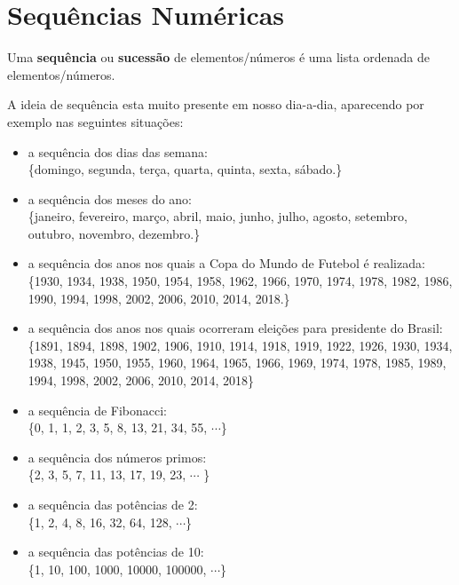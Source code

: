 \chapter{Sequências Numéricas}


\colorbox{azul}{
 \begin{minipage}{14.5cm}
 \begin{center}
  Uma \textbf{sequência} ou \textbf{sucessão} de elementos/números é uma lista ordenada de elementos/números.
 \end{center}
 \end{minipage}}
 \vskip0.3cm


A ideia de sequência esta muito presente em nosso dia-a-dia, aparecendo por exemplo nas seguintes situações:
\begin{exem}
 \begin{itemize}
  Exemplos de sequências:
  \item a sequência dos dias das semana:\\
  \{domingo, segunda, terça, quarta, quinta, sexta, sábado.\}
  \item a sequência dos meses do ano: \\
  \{janeiro, fevereiro, março, abril, maio, junho, julho, agosto, setembro, outubro, novembro, dezembro.\}
  \item a sequência dos anos nos quais a Copa do Mundo de Futebol é realizada: \\
  \{1930, 1934, 1938, 1950, 1954, 1958, 1962, 1966, 1970, 1974, 1978, 1982, 1986, 1990, 1994, 1998, 2002, 2006, 2010, 2014, 2018.\}
  \item a sequência dos anos nos quais ocorreram eleições para presidente do Brasil: \\
  \{1891, 1894, 1898, 1902, 1906, 1910, 1914, 1918, 1919, 1922, 1926, 1930, 1934, 1938, 1945, 1950, 1955, 1960, 1964, 1965, 1966, 1969, 1974, 1978, 1985, 1989, 1994, 1998, 2002, 2006, 2010, 2014, 2018\}
  \item a sequência de Fibonacci: \\
  \{0, 1, 1, 2, 3, 5, 8, 13, 21, 34, 55, $\cdots$\}
  \item a sequência dos números primos: \\
  \{2, 3, 5, 7, 11, 13, 17, 19, 23, $\cdots$ \}
  \item a sequência das potências de 2: \\
  \{1, 2, 4, 8, 16, 32, 64, 128, $\cdots$\}
  \item a sequência das potências de 10: \\
  \{1, 10, 100, 1000, 10000, 100000, $\cdots$\}
  \end{itemize}

\end{exem}

